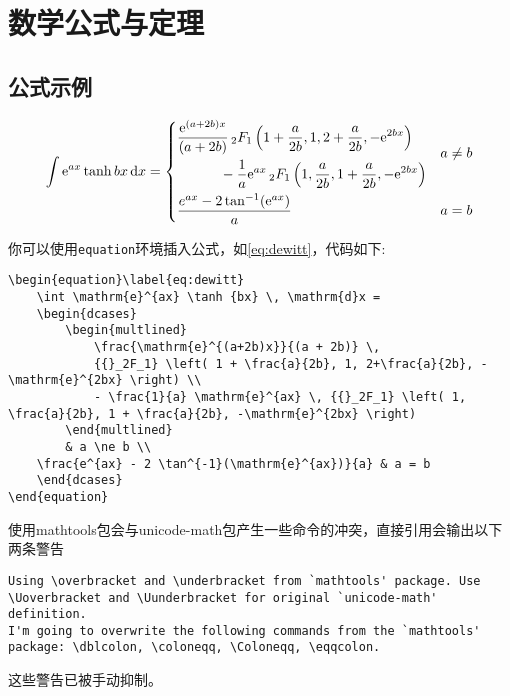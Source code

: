 \chapter{数学公式与定理}

\section{公式示例}
\begin{equation}\label{eq:dewitt}
    \int \mathrm{e}^{ax} \tanh {bx} \, \mathrm{d}x =
    \begin{dcases}
        \begin{multlined}
            \frac{\mathrm{e}^{(a+2b)x}}{(a + 2b)} \,
            {{}_2F_1} \left( 1 + \frac{a}{2b}, 1, 2+\frac{a}{2b}, -\mathrm{e}^{2bx} \right) \\
            - \frac{1}{a} \mathrm{e}^{ax} \, {{}_2F_1} \left( 1, \frac{a}{2b}, 1 + \frac{a}{2b}, -\mathrm{e}^{2bx} \right)
        \end{multlined}
        & a \ne b \\
    \frac{e^{ax} - 2 \tan^{-1}(\mathrm{e}^{ax})}{a} & a = b
  \end{dcases}
\end{equation}

你可以使用\lstinline|equation|环境插入公式，如\cref{eq:dewitt}，代码如下:
\begin{lstlisting}[style=LaTeX]
\begin{equation}\label{eq:dewitt}
    \int \mathrm{e}^{ax} \tanh {bx} \, \mathrm{d}x =
    \begin{dcases}
        \begin{multlined}
            \frac{\mathrm{e}^{(a+2b)x}}{(a + 2b)} \,
            {{}_2F_1} \left( 1 + \frac{a}{2b}, 1, 2+\frac{a}{2b}, -\mathrm{e}^{2bx} \right) \\
            - \frac{1}{a} \mathrm{e}^{ax} \, {{}_2F_1} \left( 1, \frac{a}{2b}, 1 + \frac{a}{2b}, -\mathrm{e}^{2bx} \right)
        \end{multlined}
        & a \ne b \\
    \frac{e^{ax} - 2 \tan^{-1}(\mathrm{e}^{ax})}{a} & a = b
    \end{dcases}
\end{equation}
\end{lstlisting}

使用mathtools包会与unicode-math包产生一些命令的冲突，直接引用会输出以下两条警告
\begin{lstlisting}
Using \overbracket and \underbracket from `mathtools' package. Use \Uoverbracket and \Uunderbracket for original `unicode-math' definition.
I'm going to overwrite the following commands from the `mathtools' package: \dblcolon, \coloneqq, \Coloneqq, \eqqcolon.
\end{lstlisting}
这些警告已被手动抑制。

